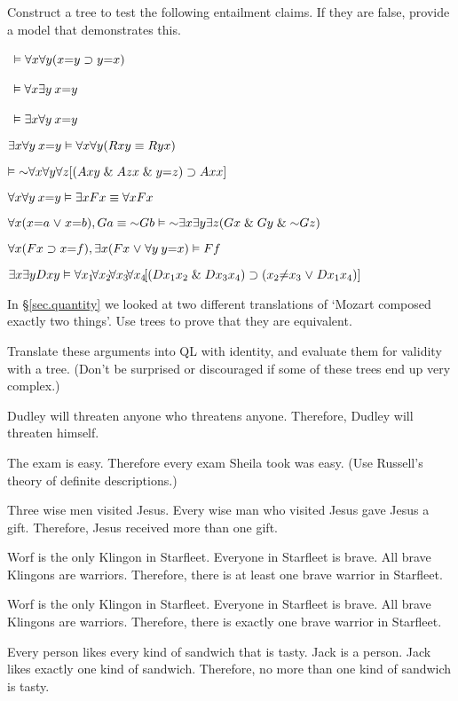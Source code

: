 \solutions
\problempart Construct a tree to test the following entailment claims. If they are false, provide a model that demonstrates this.
\label{pr.IdentityTrees}
\begin{earg}
\item\  $\vDash \forall x \forall y (x{=}y \supset y{=}x)$
\item\ $\vDash \forall x \exists y \: x{=}y$
\item\  $\vDash \exists x \forall y \: x{=}y$
\item   $\exists x \forall y \: x{=}y \vDash \forall x \forall y (Rxy \equiv Ryx)$
\item   $\models \enot \qt{\forall}{x} \qt{\forall}{y} \qt{\forall}{z} [(Axy \eand Azx \eand y{=}z) \eif Axx] $
\item  $\forall x \forall y \: x{=}y \vDash \exists x Fx \equiv \forall x Fx$
\item $\qt{\forall}{x} (x{=}a \eor x{=}b), Ga \eiff \enot Gb \models \enot \qt{\exists}{x} \qt{\exists}{y} \qt{\exists}{z} (Gx \eand Gy \eand \enot Gz)$
\item $\forall x (Fx \supset x{=}f), \exists x (Fx \mkern1mu\vee\mkern1mu \forall y \: y{=}x) \vDash Ff$
\item $\exists x \exists y Dxy \vDash \forall x_{1} \! \forall x_{2}\! \forall x_{3}\! \forall x_{4}\! [(Dx_{1}x_{2} \mathrel\& Dx_{3}x_{4}) \supset (x_{2}{\neq}x_{3} \mkern1mu\vee\mkern1mu Dx_{1}x_{4})]$
\end{earg}

\problempart In \S \ref{sec.quantity} we looked at two different translations of `Mozart composed exactly two things'. Use trees to prove that they are equivalent.

\problempart Translate these arguments into QL with identity, and evaluate them for validity with a tree. (Don't be surprised or discouraged if some of these trees end up very complex.)
\label{pr.IdentityArguments}
\begin{earg}
\item Dudley will threaten anyone who threatens anyone. Therefore, Dudley will threaten himself.
\item The exam is easy. Therefore every exam Sheila took was easy. (Use Russell's theory of definite descriptions.)
\item Three wise men visited Jesus. Every wise man who visited Jesus gave Jesus a gift. Therefore, Jesus received more than one gift.
\item Worf is the only Klingon in Starfleet. Everyone in Starfleet is brave. All brave Klingons are warriors. Therefore, there is at least one brave warrior in Starfleet.
\item Worf is the only Klingon in Starfleet. Everyone in Starfleet is brave. All brave Klingons are warriors. Therefore, there is exactly one brave warrior in Starfleet.
\item Every person likes every kind of sandwich that is tasty. Jack is a person. Jack likes exactly one kind of sandwich. Therefore, no more than one kind of sandwich is tasty.
\end{earg}


\fi 
